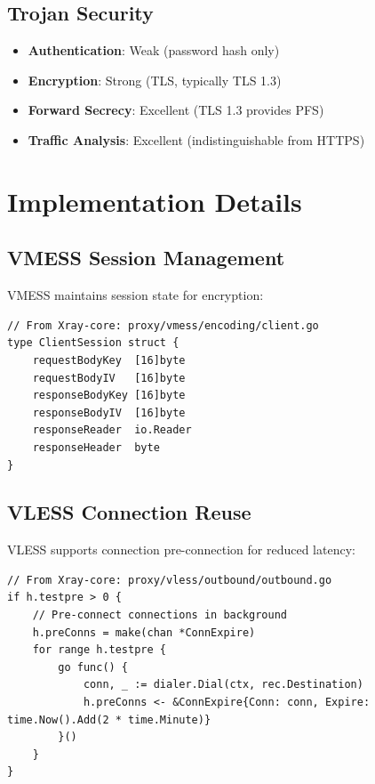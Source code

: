 \subsection{Trojan Security}

\begin{itemize}
    \item \textbf{Authentication}: Weak (password hash only)
    \item \textbf{Encryption}: Strong (TLS, typically TLS 1.3)
    \item \textbf{Forward Secrecy}: Excellent (TLS 1.3 provides PFS)
    \item \textbf{Traffic Analysis}: Excellent (indistinguishable from HTTPS)
\end{itemize}

\section{Implementation Details}

\subsection{VMESS Session Management}

VMESS maintains session state for encryption:

\begin{verbatim}
// From Xray-core: proxy/vmess/encoding/client.go
type ClientSession struct {
    requestBodyKey  [16]byte
    requestBodyIV   [16]byte
    responseBodyKey [16]byte
    responseBodyIV  [16]byte
    responseReader  io.Reader
    responseHeader  byte
}
\end{verbatim}

\subsection{VLESS Connection Reuse}

VLESS supports connection pre-connection for reduced latency:

\begin{verbatim}
// From Xray-core: proxy/vless/outbound/outbound.go
if h.testpre > 0 {
    // Pre-connect connections in background
    h.preConns = make(chan *ConnExpire)
    for range h.testpre {
        go func() {
            conn, _ := dialer.Dial(ctx, rec.Destination)
            h.preConns <- &ConnExpire{Conn: conn, Expire: time.Now().Add(2 * time.Minute)}
        }()
    }
}
\end{verbatim}

